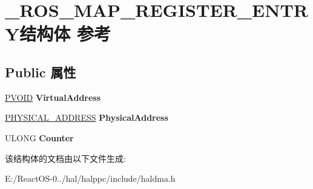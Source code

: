 \hypertarget{struct___r_o_s___m_a_p___r_e_g_i_s_t_e_r___e_n_t_r_y}{}\section{\+\_\+\+R\+O\+S\+\_\+\+M\+A\+P\+\_\+\+R\+E\+G\+I\+S\+T\+E\+R\+\_\+\+E\+N\+T\+R\+Y结构体 参考}
\label{struct___r_o_s___m_a_p___r_e_g_i_s_t_e_r___e_n_t_r_y}
\subsection*{Public 属性}
\begin{DoxyCompactItemize}
\item 
\mbox{\label{struct___r_o_s___m_a_p___r_e_g_i_s_t_e_r___e_n_t_r_y_ae8baab708c9980a1a262db3fc39720b9}} 
\hyperlink{interfacevoid}{P\+V\+O\+ID} {\bfseries Virtual\+Address}
\item 
\mbox{\label{struct___r_o_s___m_a_p___r_e_g_i_s_t_e_r___e_n_t_r_y_a929d29bdc39d565bc8479220aaa14727}} 
\hyperlink{union___l_a_r_g_e___i_n_t_e_g_e_r}{P\+H\+Y\+S\+I\+C\+A\+L\+\_\+\+A\+D\+D\+R\+E\+SS} {\bfseries Physical\+Address}
\item 
\mbox{\label{struct___r_o_s___m_a_p___r_e_g_i_s_t_e_r___e_n_t_r_y_af72a5cefe7ff976fd667aec4aa9d2ccb}} 
U\+L\+O\+NG {\bfseries Counter}
\end{DoxyCompactItemize}


该结构体的文档由以下文件生成\+:\begin{DoxyCompactItemize}
\item 
E\+:/\+React\+O\+S-\/0../hal/halppc/include/haldma.\+h\end{DoxyCompactItemize}
